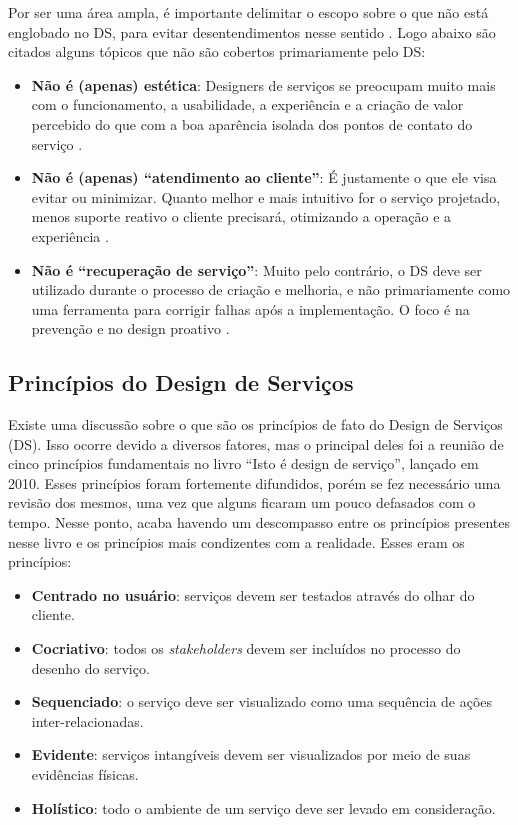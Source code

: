 Por ser uma área ampla, é importante delimitar o escopo sobre o que não está englobado no DS, para evitar desentendimentos nesse sentido \cite{Polaine2013Orange}. Logo abaixo são citados alguns tópicos que não são cobertos primariamente pelo DS:

\begin{itemize}
	\item \textbf{Não é (apenas) estética}: Designers de serviços se preocupam muito mais com o funcionamento, a usabilidade, a experiência e a criação de valor percebido do que com a boa aparência isolada dos pontos de contato do serviço \cite{Polaine2013Orange}.
	
	\item \textbf{Não é (apenas) ``atendimento ao cliente''}: É justamente o que ele visa evitar ou minimizar. Quanto melhor e mais intuitivo for o serviço projetado, menos suporte reativo o cliente precisará, otimizando a operação e a experiência \cite{Stickdorn2019}.
	
	\item \textbf{Não é ``recuperação de serviço''}: Muito pelo contrário, o DS deve ser utilizado durante o processo de criação e melhoria, e não primariamente como uma ferramenta para corrigir falhas após a implementação. O foco é na prevenção e no design proativo \cite{Patricio2011Multilevel}.
\end{itemize}


\subsection{Princípios do Design de Serviços}

Existe uma discussão sobre o que são os princípios de fato do Design de Serviços (DS). Isso ocorre devido a diversos fatores, mas o principal deles foi a reunião de cinco princípios fundamentais no livro ``Isto é design de serviço'', lançado em 2010. Esses princípios foram fortemente difundidos, porém se fez necessário uma revisão dos mesmos, uma vez que alguns ficaram um pouco defasados com o tempo. Nesse ponto, acaba havendo um descompasso entre os princípios presentes nesse livro e os princípios mais condizentes com a realidade. Esses eram os princípios:

\begin{itemize}
	\item \textbf{Centrado no usuário}: serviços devem ser testados através do olhar do cliente.
	\item \textbf{Cocriativo}: todos os \textit{stakeholders} devem ser incluídos no processo do desenho do serviço.
	\item \textbf{Sequenciado}: o serviço deve ser visualizado como uma sequência de ações inter-relacionadas.
	\item \textbf{Evidente}: serviços intangíveis devem ser visualizados por meio de suas evidências físicas.
	\item \textbf{Holístico}: todo o ambiente de um serviço deve ser levado em consideração.
\end{itemize}

